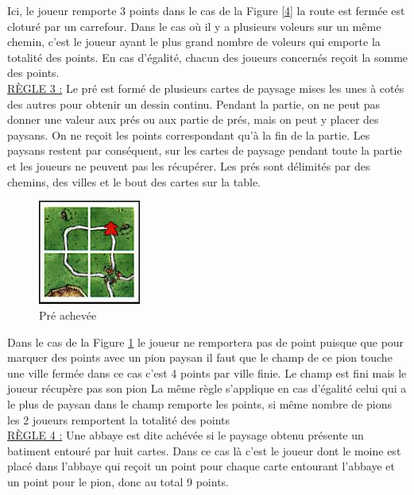 \documentclass[12pt]{article}
\begin{document}
\begin{itemize}
Ici, le joueur remporte 3 points dans le cas de la Figure \ref{4} la route est fermée est cloturé par un carrefour. Dans le cas où il y a plusieurs voleurs sur un même chemin, c'est le joueur ayant le plus grand nombre de voleurs qui emporte la totalité des points. En cas d'égalité, chacun des joueurs concernés reçoit la somme des points.\\

\newpage \underline{RÈGLE 3 :} Le pré est formé de plusieurs cartes de paysage mises les unes à cotés des autres pour obtenir un dessin continu. Pendant la partie, on ne peut pas donner une valeur aux prés ou aux partie de prés, mais on peut y placer des paysans. On ne reçoit les points correspondant qu'à la fin de la partie. Les paysans restent par conséquent, sur les cartes de paysage pendant toute la partie et les joueurs ne peuvent pas les récupérer. Les prés sont délimités par des chemins, des villes et le bout des cartes sur la table. \newline

\begin{figure}[h!]
\begin{center}
\includegraphics[width=0.3\textwidth]{pre_achevee.jpg}
\end{center}
\caption{Pré achevée} \label{5}
\end{figure}

Dans le cas de la Figure \ref{5} le joueur ne remportera pas de point puisque que pour marquer des points avec un pion paysan il faut que le champ de ce pion touche une ville fermée dans ce cas c'est 4 points par ville finie. Le champ est fini mais le joueur récupère pas son pion La même règle s'applique en cas d'égalité celui qui a le plus de paysan dans le champ remporte les points, si même nombre de pions les 2 joueurs remportent la totalité des points\\

\underline{RÈGLE 4 :} Une abbaye est dite achévée si le paysage obtenu présente un batiment entouré par huit cartes. Dans ce cas là c'est le joueur dont le moine est placé dans l'abbaye qui reçoit un point pour chaque carte entourant l'abbaye et un point pour le pion, donc au total 9 points.\newline


\end{itemize}
\end{document}
